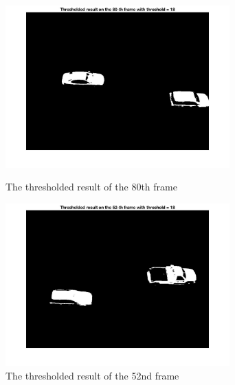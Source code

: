 \documentclass[a4paper]{article}
\begin{document}
\begin{spacing}{2.0}
\begin{enumerate}
	\begin{figure}[H]
	    \begin{minipage}[t]{0.5\textwidth}
	        \centering
	        \includegraphics[width=3.4in]{2_3.jpg}
	        \caption{The thresholded result of the 80th frame}
	        \label{fig:side:a}
	    \end{minipage}%
	  \begin{minipage}[t]{0.5\textwidth}
	      \centering
	      \includegraphics[width=3.4in]{2_4.jpg}
	      \caption{The thresholded result of the 52nd frame}
	      \label{fig:side:b}
	    \end{minipage}
	\end{figure}
	

\end{enumerate}
\end{spacing}
\end{document}

